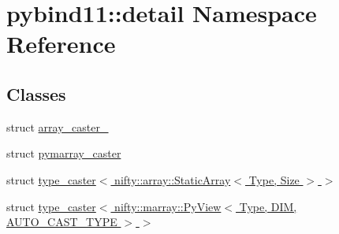 \hypertarget{namespacepybind11_1_1detail}{}\section{pybind11\+:\+:detail Namespace Reference}
\label{namespacepybind11_1_1detail}
\subsection*{Classes}
\begin{DoxyCompactItemize}
\item 
struct \hyperlink{structpybind11_1_1detail_1_1array__caster__}{array\+\_\+caster\+\_\+}
\item 
struct \hyperlink{structpybind11_1_1detail_1_1pymarray__caster}{pymarray\+\_\+caster}
\item 
struct \hyperlink{structpybind11_1_1detail_1_1type__caster_3_01nifty_1_1array_1_1StaticArray_3_01Type_00_01Size_01_4_01_4}{type\+\_\+caster$<$ nifty\+::array\+::\+Static\+Array$<$ Type, Size $>$ $>$}
\item 
struct \hyperlink{structpybind11_1_1detail_1_1type__caster_3_01nifty_1_1marray_1_1PyView_3_01Type_00_01DIM_00_01AUTO__CAST__TYPE_01_4_01_4}{type\+\_\+caster$<$ nifty\+::marray\+::\+Py\+View$<$ Type, D\+I\+M, A\+U\+T\+O\+\_\+\+C\+A\+S\+T\+\_\+\+T\+Y\+P\+E $>$ $>$}
\end{DoxyCompactItemize}

